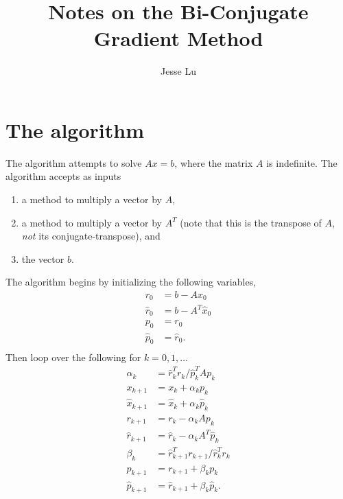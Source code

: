\documentclass{article}
\title{Notes on the Bi-Conjugate Gradient Method}
\author{Jesse Lu}
\begin{document}
\maketitle
\tableofcontents
\section{The algorithm}
The algorithm attempts to solve $Ax = b$,
    where the matrix $A$ is indefinite.
The algorithm accepts as inputs
    \begin{enumerate}
    \item a method to multiply a vector by $A$,
    \item a method to multiply a vector by $A^T$ 
        (note that this is the transpose of $A$, 
        \emph{not} its conjugate-transpose), and
    \item the vector $b$.
    \end{enumerate}

The algorithm begins by initializing the following variables,
    \begin{subequations}\begin{align}
    r_0 &= b - Ax_0 \\
    \hat{r}_0 &= b - A^T \hat{x}_0 \\
    p_0 &= r_0 \\
    \hat{p}_0 &= \hat{r}_0.
    \end{align}\end{subequations}
    \begin{subequations}\begin{align}
    \end{align}\end{subequations}
Then loop over the following for $k = 0, 1, \ldots$
    \begin{subequations}\begin{align}
    \alpha_k &= \hat{r}_k^T r_k / \hat{p}_k^T A p_k \\
    x_{k+1} &= x_k + \alpha_k p_k \\
    \hat{x}_{k+1} &= \hat{x}_k + {\alpha_k} \hat{p}_k \\
    r_{k+1} &= r_k - \alpha_k A p_k \\
    \hat{r}_{k+1} &= \hat{r}_k - {\alpha_k} A^T \hat{p}_k \\
    \beta_k &= \hat{r}_{k+1}^T r_{k+1} / \hat{r}_k^T r_k \\
    p_{k+1} &= r_{k+1} + \beta_k p_k \\
    \hat{p}_{k+1} &= \hat{r}_{k+1} + {\beta_k} \hat{p}_k.
    \end{align}\end{subequations}
\end{document}
